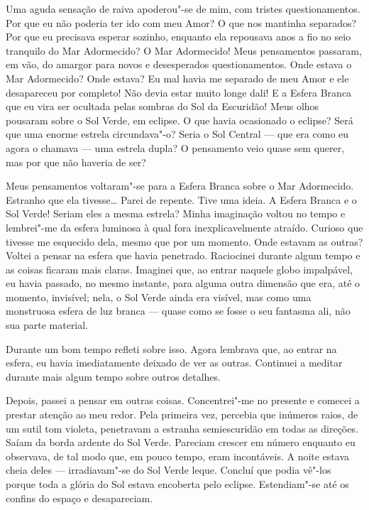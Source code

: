 Uma aguda sensação de raiva apoderou"-se de mim, com tristes questionamentos. Por que eu não poderia ter ido com
meu Amor? O que nos mantinha separados? Por que eu precisava esperar sozinho, enquanto ela repousava anos a fio no seio
tranquilo do Mar Adormecido? O Mar Adormecido! Meus pensamentos passaram, em vão, do amargor para novos e desesperados
questionamentos. Onde estava o Mar Adormecido? Onde estava? Eu mal havia me separado de meu Amor
e ele desapareceu por completo! Não devia estar muito longe dali! E a Esfera Branca que eu vira ser ocultada
pelas sombras do Sol da Escuridão! Meus olhos pousaram sobre o Sol Verde, em eclipse. O que havia ocasionado o eclipse?
Será que uma enorme estrela circundava"-o? Seria o Sol Central --- que era como eu agora o chamava --- uma estrela dupla? O
pensamento veio quase sem querer, mas por que não haveria de ser?

Meus pensamentos voltaram"-se para a Esfera Branca sobre o Mar Adormecido. Estranho que ela tivesse\ldots{} Parei de repente.
Tive uma ideia. A Esfera Branca e o Sol Verde! Seriam eles a mesma estrela? Minha imaginação voltou no tempo e
lembrei"-me da esfera luminosa à qual fora inexplicavelmente atraído. Curioso que tivesse me esquecido dela, mesmo que
por um momento. Onde estavam as outras? Voltei a pensar na esfera que havia penetrado. Raciocinei durante algum tempo
e as coisas ficaram mais claras. Imaginei que, ao entrar naquele globo impalpável, eu havia passado, no mesmo instante,
para alguma outra dimensão que era, até o momento, invisível; nela, o Sol Verde ainda era visível, mas como uma
monstruosa esfera de luz branca --- quase como se fosse o seu fantasma ali, não sua parte material.

Durante um bom tempo refleti sobre isso. Agora lembrava que, ao entrar na esfera, eu havia imediatamente deixado de ver
as outras. Continuei a meditar durante mais algum tempo sobre outros detalhes.

Depois, passei a pensar em outras coisas. Concentrei"-me no presente e comecei a prestar atenção ao meu redor. Pela
primeira vez, percebia que inúmeros raios, de um sutil tom violeta, penetravam a estranha semiescuridão em todas as
direções. Saíam da borda ardente do Sol Verde. Pareciam crescer em número enquanto eu observava, de tal modo que, em
pouco tempo, eram incontáveis. A noite estava cheia deles --- irradiavam"-se do Sol Verde leque. Concluí que podia vê"-los
porque toda a glória do Sol estava encoberta pelo eclipse. Estendiam"-se até os confins do espaço e desapareciam.

